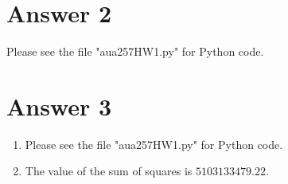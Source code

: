 \documentclass[12pt]{article}
\begin{document}
\section*{Answer 2}
Please see the file "aua257HW1.py" for Python code.

\section*{Answer 3}
\begin{enumerate}[label=(\alph*)]
\item Please see the file "aua257HW1.py" for Python code.
\item The value of the sum of squares is $5103133479.22$.

\end{enumerate}
\end{document}
